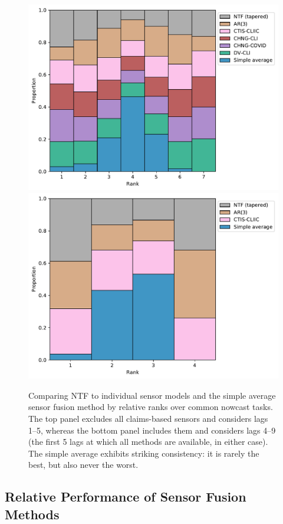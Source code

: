 \documentclass[sts]{imsart}
\theoremstyle{plain}
\theoremstyle{definition}
\theoremstyle{remark}
\begin{document}
\begin{figure}[tb]
\centering
\includegraphics[width=0.95\linewidth]{./figures/rankplot_claims_no_google_aa.pdf}
\includegraphics[width=0.95\linewidth]{./figures/rankplot_no_claims_no_google_aa.pdf}
\caption{Comparing NTF to individual sensor models and the simple average sensor
  fusion method by relative ranks over common nowcast tasks. The top panel
  excludes all claims-based sensors and considers lags 1--5, whereas the bottom
  panel includes them and considers lags 4--9 (the first 5 lags at which all
  methods are available, in either case). The simple average exhibits striking
  consistency: it is rarely the best, but also never the worst.} 
	\label{fig:sensor_rank_no_google_aa}
\end{figure}

\subsection{Relative Performance of Sensor Fusion Methods}
 
\end{document}

